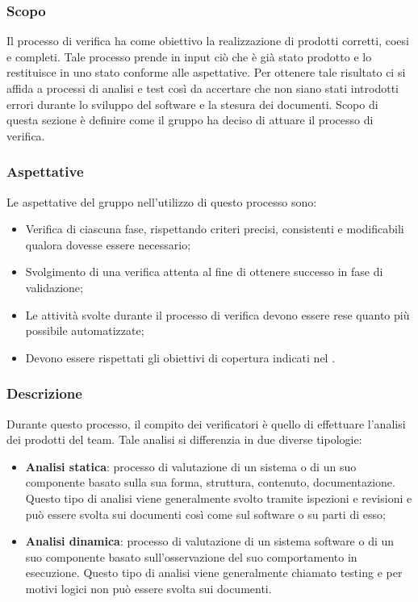 \subsubsection{Scopo}
Il processo di verifica ha come obiettivo la realizzazione di prodotti corretti, coesi e completi. Tale processo prende in input ciò che è già stato prodotto e lo restituisce in uno stato conforme alle aspettative. Per ottenere tale risultato ci si affida a processi di analisi e test così da accertare che non siano stati introdotti errori durante lo sviluppo del software e la stesura dei documenti. Scopo di questa sezione è definire come il gruppo ha deciso di attuare il processo di verifica.

\subsubsection{Aspettative}
Le aspettative del gruppo \groupName{} nell'utilizzo di questo processo sono:
\begin{itemize}
    \item Verifica di ciascuna fase, rispettando criteri precisi, consistenti e modificabili qualora dovesse essere necessario;
    \item Svolgimento di una verifica attenta al fine di ottenere successo in fase di validazione;
    \item Le attività svolte durante il processo di verifica devono essere rese quanto più possibile automatizzate;
    \item Devono essere rispettati gli obiettivi di copertura indicati nel \docNamePdQLow{}.
\end{itemize}

\subsubsection{Descrizione}
Durante questo processo, il compito dei verificatori è quello di effettuare l'analisi dei prodotti del team. Tale analisi si differenzia in due diverse tipologie:
\begin{itemize}
    \item \textbf{Analisi statica}: processo di valutazione di un sistema o di un suo componente basato sulla sua forma, struttura, contenuto, documentazione. Questo tipo di analisi viene generalmente svolto tramite ispezioni e revisioni e può essere svolta sui documenti così come sul software o su parti di esso;
    \item \textbf{Analisi dinamica}: processo di valutazione di un sistema software o di un suo componente basato sull'osservazione del suo comportamento in esecuzione. Questo tipo di analisi viene generalmente chiamato testing e per motivi logici non può essere svolta sui documenti.
\end{itemize}

